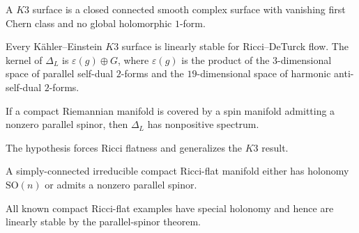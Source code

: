 \begin{definition}
\label{def:chow-iv-k3-surface}
A $K3$ surface is a closed connected smooth complex surface with vanishing
first Chern class and no global holomorphic $1$-form.
\end{definition}

\begin{proposition}
\label{prop:chow-iv-k3-linear-stability}
Every K\"ahler--Einstein $K3$ surface is linearly stable for Ricci--DeTurck
flow.  The kernel of $\Delta_L$ is $\varepsilon(g)\oplus G$, where
$\varepsilon(g)$ is the product of the $3$-dimensional space of parallel
self-dual $2$-forms and the $19$-dimensional space of harmonic anti-self-dual
$2$-forms.
\end{proposition}

\begin{theorem}
\label{thm:chow-iv-parallel-spinor-stability}
If a compact Riemannian manifold is covered by a spin manifold admitting a
nonzero parallel spinor, then $\Delta_L$ has nonpositive spectrum.
\end{theorem}

\begin{remark}
\label{rem:chow-iv-parallel-spinor-rigidity}
The hypothesis forces Ricci flatness and generalizes the $K3$ result.
\end{remark}

\begin{proposition}
\label{prop:chow-iv-ricci-flat-holonomy}
A simply-connected irreducible compact Ricci-flat manifold either has holonomy
$\mathrm{SO}(n)$ or admits a nonzero parallel spinor.
\end{proposition}

\begin{remark}
\label{rem:chow-iv-known-ricci-flat-stability}
All known compact Ricci-flat examples have special holonomy and hence are
linearly stable by the parallel-spinor theorem.
\end{remark}

